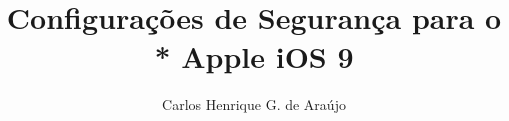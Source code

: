 \documentclass[12pt,oneside]{book}
\begin{document}
\frontmatter

\title{Configura\c c\~oes de Seguran\c ca para o \\* Apple iOS 9}
\author{Carlos Henrique G. de Ara\'ujo}

\maketitle

\tableofcontents

\mainmatter







\appendix

\end{document}

